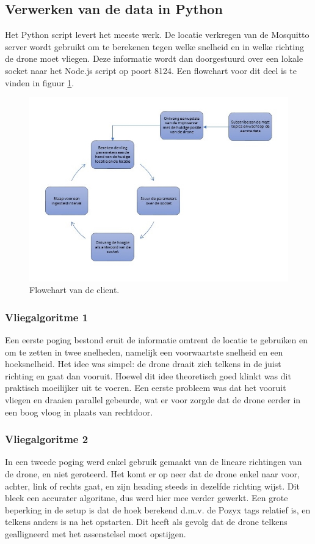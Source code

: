 \subsection{Verwerken van de data in Python}
Het Python script levert het meeste werk. De locatie verkregen van de Mosquitto server wordt gebruikt om te berekenen tegen welke snelheid en in welke richting de drone moet vliegen.
Deze informatie wordt dan doorgestuurd over een lokale socket naar het Node.js script op poort 8124.
Een flowchart voor dit deel is te vinden in figuur \ref{fig:flowchart_client}.
\begin{figure}[p]
	\centering
	\includegraphics[width=\textwidth]{images/python_client_flowchart}
	\caption[Flowchart van de client]{Flowchart van de client.}
	\label{fig:flowchart_client}
\end{figure}

\subsubsection{Vliegalgoritme 1}
Een eerste poging bestond eruit de informatie omtrent de locatie te gebruiken en om te zetten in twee snelheden, namelijk een voorwaartste snelheid en een hoeksnelheid.
Het idee was simpel: de drone draait zich telkens in de juist richting en gaat dan vooruit.
Hoewel dit idee theoretisch goed klinkt was dit praktisch moeilijker uit te voeren.
Een eerste probleem was dat het vooruit vliegen en draaien parallel gebeurde, wat er voor zorgde dat de drone eerder in een boog vloog in plaats van rechtdoor.

\subsubsection{Vliegalgoritme 2}
In een tweede poging werd enkel gebruik gemaakt van de lineare richtingen van de drone, en niet geroteerd. Het komt er op neer dat de drone enkel naar voor, achter, link of rechts gaat, en zijn heading steeds in dezelfde richting wijst. Dit bleek een accurater algoritme, dus werd hier mee verder gewerkt. Een grote beperking in de setup is dat de hoek berekend d.m.v. de Pozyx tags relatief is, en telkens anders is na het opstarten. Dit heeft als gevolg dat de drone telkens gealligneerd met het assenstelsel moet opstijgen. \\

